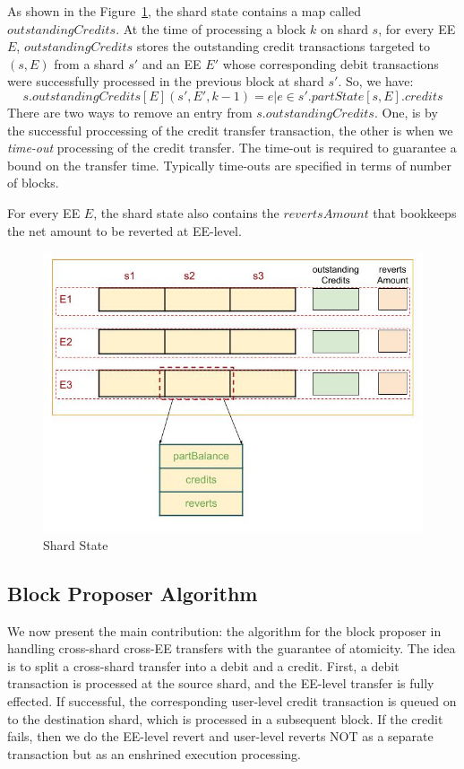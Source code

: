 \documentclass{article}
\begin{document}
As shown in the Figure~\ref{fig:shardstate}, the shard state contains a map called $outstandingCredits$. At the time of processing a block $k$ on shard $s$, for every EE $E$, $outstandingCredits$ stores the outstanding credit transactions targeted to $(s,E)$ from a shard $s'$ and an EE $E'$ whose corresponding debit transactions were successfully processed in the previous block at shard $s'$. So, we have:
\[
	s.outstandingCredits[E](s', E', k-1) = {e | e \in s'.partState[s,E].credits}
\]
There are two ways to remove an entry from $s.outstandingCredits$. One, is by the successful proccessing of the credit transfer transaction, the other is when we {\em time-out} processing of the credit transfer. The time-out is required to guarantee a bound on the transfer time. Typically time-outs are specified in terms of number of blocks.

For every EE $E$, the shard state also contains the $revertsAmount$ that bookkeeps the net amount to be reverted at EE-level.

\begin{figure}[h]
\includegraphics[scale=0.5]{state.jpg}
\caption{Shard State\label{fig:shardstate}}
\end{figure}

\subsection{Block Proposer Algorithm}
We now present the main contribution: the algorithm for the block proposer in handling cross-shard cross-EE transfers with the guarantee of atomicity. The idea is to split a cross-shard transfer into a debit and a credit. First, a debit transaction is processed at the source shard, and the EE-level transfer is fully effected. If successful, the corresponding user-level credit transaction is queued on to the destination shard, which is processed in a subsequent block. If the credit fails, then we do the EE-level revert and user-level reverts NOT as a separate transaction but as an enshrined execution processing. 
\end{document}
